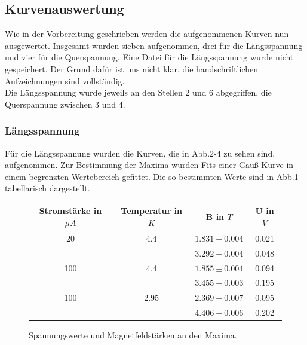 \FloatBarrier
\subsection{Kurvenauswertung}

Wie in der Vorbereitung geschrieben werden die aufgenommenen Kurven nun ausgewertet. Insgesamt wurden sieben aufgenommen, drei für die Längsspannung und vier für die Querspannung. Eine Datei für die Längsspannung wurde nicht gespeichert. Der Grund dafür ist uns nicht klar, die handschriftlichen Aufzeichnungen sind vollständig. \\
Die Längsspannung wurde jeweils an den Stellen 2 und 6 abgegriffen, die Querspannung zwischen 3 und 4.

\subsubsection{Längsspannung}
Für die Längsspannung wurden die Kurven, die in Abb.2-4 zu sehen sind, aufgenommen. Zur Bestimmung der Maxima wurden Fits einer Gauß-Kurve in einem begrenzten Wertebereich gefittet. Die so bestimmten Werte sind in Abb.1 tabellarisch dargestellt.


\begin{figure}
\centering
\caption{Spannungswerte und Magnetfeldstärken an den Maxima.}
\vspace*{0.5cm}
\begin{tabular}{cccc}
\hline
Stromstärke in $\mu A$ & Temperatur in $K$ & B in $T$ & U in $V$ \\
\hline
\hline
20  & 4.4  & $1.831 \pm 0.004$ & 0.021 \\
	&		& $3.292 \pm 0.004$ & 0.048 \\
100 & 4.4  & $1.855 \pm 0.004$ & 0.094 \\
	&		& $3.455 \pm 0.003$ & 0.195 \\
100 & 2.95  & $2.369 \pm 0.007$ & 0.095 \\
	&		& $4.406 \pm 0.006$ & 0.202 \\
\hline
\end{tabular}
\end{figure}

